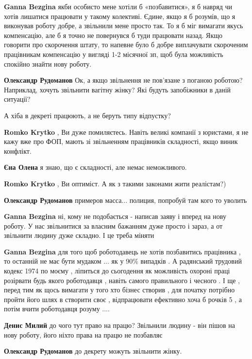 \begin{itemize}
\begin{itemize}
\textbf{Ganna Bezgina} якби особисто мене хотіли б «позбавитися», я б навряд чи хотів лишатися працювати у такому колективі. Єдине, якщо я б розумів, що я виконував роботу добре, а звільнили мене просто так. То я б міг вимагати якусь компенсацію, але б я точно не повернувся б туди працювати назад.
Якщо говорити про скорочення штату, то напевне було б добре виплачувати скороченим працівникам компенсацію у вигляді 1-2 місячної зп, щоб була можливість спокійно знайти нову роботу.

\textbf{Олександр Рудоманов} Ок, а якщо звільнення не пов'язане з поганою роботою? Наприклад, хочуть звільнити вагітну жінку? Які будуть запобіжники в даній ситуації?


А хіба в декреті працюють, а не беруть типу відпустку?

\textbf{Romko Krytko} , Ви дуже помиляєтесь. Навіть великі компанії з юристами, я не кажу вже про ФОП, мають зі звільненням працівників складності, якщо виник конфлікт.

\textbf{Єна Олена} я знаю, що є складності, але немає неможливого.

\textbf{Romko Krytko} , Ви оптиміст. А як з такими законами жити реалістам?)

\textbf{Олександр Рудоманов} примеров масса... полиция, попробуй там кого то уволить

\textbf{Ganna Bezgina} ні, кому не подобається - написав заяву і вперед на нову роботу. У нас звільнитися за власним бажанням дуже просто і зараз, а от звільнити людину дуже складно. І це треба міняти

\textbf{Ganna Bezgina} для того щоб роботодавець не хотів позбавитись
працівника , то останній не має бути мудаком ... як у 90\% випадків . А радянський
трудовий кодекс 1974 по моєму , ліпиться до сьогодення як можливість охороні
праці розірвати будь якого роботодавця , навіть самого правильного і чесного .
І ще , перед тим як щось вимагати у того хто бізнес створив , для початку
потрібно пройти його шлях в створити своє , відпрацювати ефективно хоча б
рочків 5 , а потім вчити роботодавця розуму ....

\textbf{Денис Милий} до чого тут право на працю? Звільнили людину - він пішов на нову роботу, його ніхто права на працю не позбавляє

\textbf{Олександр Рудоманов} до декрету можуть звільнити жінку.


\end{itemize}
\end{itemize}
